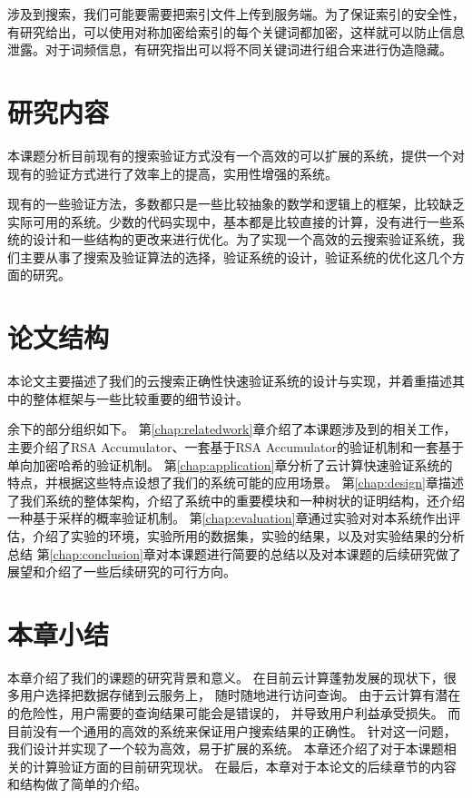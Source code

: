 						    涉及到搜索，我们可能要需要把索引文件上传到服务端。为了保证索引的安全性，有研究给出，可以使用对称加密给索引的每个关键词都加密，这样就可以防止信息泄露。对于词频信息，有研究指出可以将不同关键词进行组合来进行伪造隐藏。

\section{研究内容}
本课题分析目前现有的搜索验证方式没有一个高效的可以扩展的系统，提供一个对现有的验证方式进行了效率上的提高，实用性增强的系统。

现有的一些验证方法，多数都只是一些比较抽象的数学和逻辑上的框架，比较缺乏实际可用的系统。少数的代码实现中，基本都是比较直接的计算，没有进行一些系统的设计和一些结构的更改来进行优化。为了实现一个高效的云搜索验证系统，我们主要从事了搜索及验证算法的选择，验证系统的设计，验证系统的优化这几个方面的研究。

\section{论文结构}
本论文主要描述了我们的云搜索正确性快速验证系统的设计与实现，并着重描述其中的整体框架与一些比较重要的细节设计。

余下的部分组织如下。
第\ref{chap:relatedwork}章介绍了本课题涉及到的相关工作，主要介绍了RSA Accumulator、一套基于RSA Accumulator的验证机制和一套基于单向加密哈希的验证机制。
第\ref{chap:application}章分析了云计算快速验证系统的特点，并根据这些特点设想了我们的系统可能的应用场景。
第\ref{chap:design}章描述了我们系统的整体架构，介绍了系统中的重要模块和一种树状的证明结构，还介绍一种基于采样的概率验证机制。
第\ref{chap:evaluation}章通过实验对对本系统作出评估，介绍了实验的环境，实验所用的数据集，实验的结果，以及对实验结果的分析总结
第\ref{chap:conclusion}章对本课题进行简要的总结以及对本课题的后续研究做了展望和介绍了一些后续研究的可行方向。


\section{本章小结}
本章介绍了我们的课题的研究背景和意义。
在目前云计算蓬勃发展的现状下，很多用户选择把数据存储到云服务上，
随时随地进行访问查询。
由于云计算有潜在的危险性，用户需要的查询结果可能会是错误的，
并导致用户利益承受损失。
而目前没有一个通用的高效的系统来保证用户搜索结果的正确性。
针对这一问题，我们设计并实现了一个较为高效，易于扩展的系统。
本章还介绍了对于本课题相关的计算验证方面的目前研究现状。
在最后，本章对于本论文的后续章节的内容和结构做了简单的介绍。
